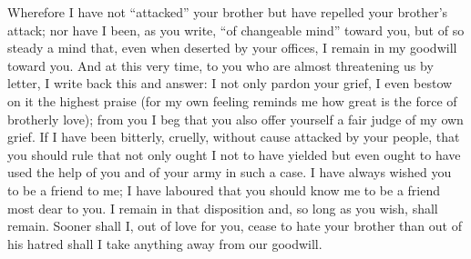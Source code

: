  Wherefore I have not ``attacked'' your brother but have repelled your brother's attack; nor have I been, as you write, ``of changeable mind'' toward you, but of so steady a mind that, even when deserted by your offices, I remain in my goodwill toward you. And at this very time, to you who are almost threatening us by letter, I write back this and answer: I not only pardon your grief, I even bestow on it the highest praise (for my own feeling reminds me how great is the force of brotherly love); from you I beg that you also offer yourself a fair judge of my own grief. If I have been bitterly, cruelly, without cause attacked by your people, that you should rule that not only ought I not to have yielded but even ought to have used the help of you and of your army in such a case. I have always wished you to be a friend to me; I have laboured that you should know me to be a friend most dear to you. I remain in that disposition and, so long as you wish, shall remain. Sooner shall I, out of love for you, cease to hate your brother than out of his hatred shall I take anything away from our goodwill.
